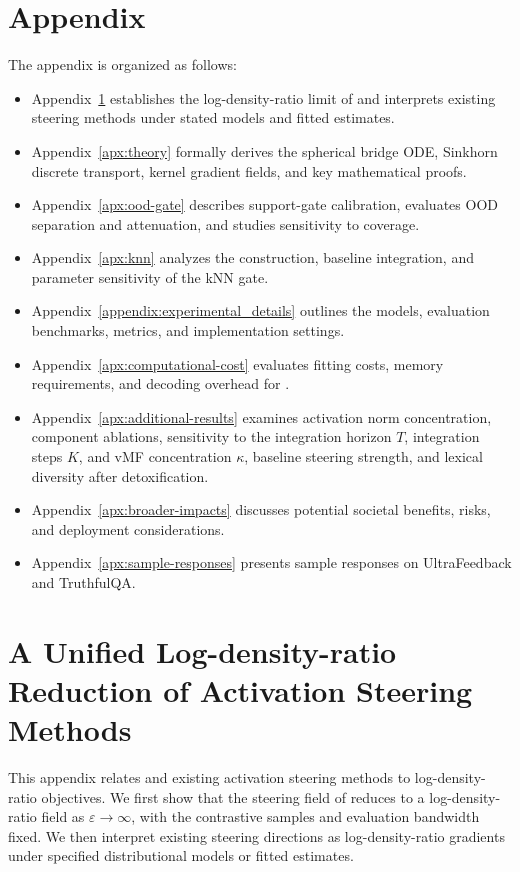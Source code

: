 \section*{Appendix}

The appendix is organized as follows:

\begin{itemize}
    \item Appendix~\ref{apx:ldr-formalize} establishes the log-density-ratio limit of \Cobras and interprets existing steering methods under stated models and fitted estimates.
    \item Appendix~\ref{apx:theory} formally derives the spherical bridge ODE, Sinkhorn discrete transport, kernel gradient fields, and key mathematical proofs.
    \item Appendix~\ref{apx:ood-gate} describes support-gate calibration, evaluates OOD separation and attenuation, and studies sensitivity to coverage.
    \item Appendix~\ref{apx:knn} analyzes the construction, baseline integration, and parameter sensitivity of the kNN gate.
    \item Appendix~\ref{appendix:experimental_details} outlines the models, evaluation benchmarks, metrics, and implementation settings.
    \item Appendix~\ref{apx:computational-cost} evaluates fitting costs, memory requirements, and decoding overhead for \Cobras.
    \item Appendix~\ref{apx:additional-results} examines activation norm concentration, component ablations, sensitivity to the integration horizon $T$, integration steps $K$, and vMF concentration $\kappa$, baseline steering strength, and lexical diversity after detoxification.
    \item Appendix~\ref{apx:broader-impacts} discusses potential societal benefits, risks, and deployment considerations.
    \item Appendix~\ref{apx:sample-responses} presents sample responses on UltraFeedback and TruthfulQA.
\end{itemize}

\section{A Unified Log-density-ratio Reduction of Activation Steering Methods}
\label{apx:ldr-formalize}

This appendix relates \Cobras and existing activation steering methods to log-density-ratio objectives. We first show that the steering field of \Cobras reduces to a log-density-ratio field as $\varepsilon\to\infty$, with the contrastive samples and evaluation bandwidth fixed. We then interpret existing steering directions as log-density-ratio gradients under specified distributional models or fitted estimates.

